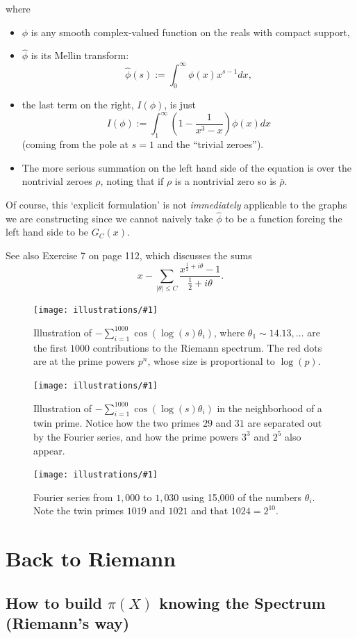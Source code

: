 \documentclass[openany]{book}
\newcommand{\ill}[3]{%
   \begin{figure}[H]%
   \vspace{-2ex}
   \centering%
   \texttt{[image: illustrations/\#1]}%
   \caption{#3}%
   \vspace{-2ex}
    \end{figure}}
\theoremstyle{plain}
\theoremstyle{definition}
\begin{document}
{{{where \begin{itemize} \item $\phi$ is any smooth complex-valued
  function on the reals with compact support,\item ${\hat \phi}$ is
  its Mellin transform: $${\hat \phi}(s):=
  \int_0^{\infty}\phi(x)x^{s-1}dx,$$ \item the last term on the right,
  $I(\phi)$, is just
 $$I(\phi):= \int_1^{\infty}(1-{\frac{1}{x^3-x}})\phi(x)dx$$ (coming from the pole at $s=1$ and the ``trivial zeroes''). \item The more serious  summation on the left hand side of the equation is over the nontrivial zeroes $\rho$, noting that if $\rho$ is a nontrivial zero so is ${\bar \rho}$. \end{itemize}



Of course, this `explicit formulation' is not {\it immediately}
applicable to the graphs we are constructing since we cannot naively
take ${\hat \phi}$ to be a function forcing the left hand side to be
$G_C(x)$.

   See also Exercise 7 on page 112,  which discusses the sums $$x - \sum_{|\theta| \le C} {\frac{x^{{\frac{1}{2}} +i\theta}-1}{{\frac{1}{2}} +i\theta}}.$$}


 \ill{phi_cos_sum_2_30_1000}{.8}{Illustration of $-\sum_{i=1}^{1000}
   \cos(\log(s)\theta_i)$, where $\theta_1 \sim 14.13, \ldots$ are the
   first $1000$ contributions to the Riemann spectrum.  The red dots
   are at the prime powers $p^n$, whose size is proportional to
   $\log(p)$.}

 \ill{phi_cos_sum_26_34_1000}{.8}{Illustration of $-\sum_{i=1}^{1000}
   \cos(\log(s)\theta_i)$ in the neighborhood of a twin prime.  Notice
   how the two primes $29$ and $31$ are separated out by the Fourier
   series, and how the prime powers $3^3$ and $2^5$ also appear.}

 \ill{phi_cos_sum_1010_1026_15000}{.7}{Fourier series from $1,000$ to
   $1,030$ using 15,000 of the numbers $\theta_i$.  Note the twin
   primes $1019$ and $1021$ and that $1024=2^{10}$.}


\part{Back to Riemann\label{part4}}


\chapter[Building $\pi(X)$ knowing the Spectrum]{How to build $\pi(X)$ knowing the Spectrum (Riemann's way)}


}}
\end{document}
